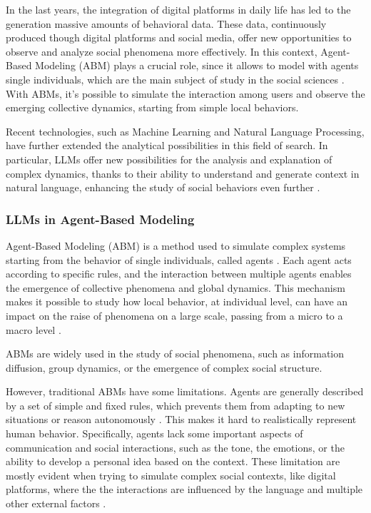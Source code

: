 In the last years, the integration of digital platforms in daily life has led to the generation massive amounts of behavioral data.
These data, continuously produced though digital platforms and social media, offer new opportunities to observe and analyze social phenomena more effectively.
In this context, Agent-Based Modeling (ABM) plays a crucial role, since it allows to model with agents single individuals, which are the main subject of study in the social sciences \cite{conte2012manifesto}.
With ABMs, it's possible to simulate the interaction among users and observe the emerging collective dynamics, starting from simple local behaviors.

Recent technologies, such as Machine Learning and Natural Language Processing, have further extended the analytical possibilities in this field of search.
In particular, LLMs offer new possibilities for the analysis and explanation of complex dynamics, thanks to their ability to understand and generate context in natural language, enhancing the study of social behaviors even further \cite{thapa2025llm}.


\subsubsection{LLMs in Agent-Based Modeling}
Agent-Based Modeling (ABM) is a method used to simulate complex systems starting from the behavior of single individuals, called agents \cite{macy2002abm}.
Each agent acts according to specific rules, and the interaction between multiple agents enables the emergence of collective phenomena and global dynamics.
This mechanism makes it possible to study how local behavior, at individual level, can have an impact on the raise of phenomena on a large scale, passing from a micro to a macro level \cite{gausen2021can}.

ABMs are widely used in the study of social phenomena, such as information diffusion, group dynamics, or the emergence of complex social structure.

\medskip
However, traditional ABMs have some limitations.
Agents are generally described by a set of simple and fixed rules, which prevents them from adapting to new situations or reason autonomously \cite{conte2014agent, törnberg2023evaluate}.
This makes it hard to realistically represent human behavior. Specifically, agents lack some important aspects of communication and social interactions, such as the tone, the emotions, or the ability to develop a personal idea based on the context.
These limitation are mostly evident when trying to simulate complex social contexts, like digital platforms, where the the interactions are influenced by the language and multiple other external factors \cite{törnberg2023evaluate}.

